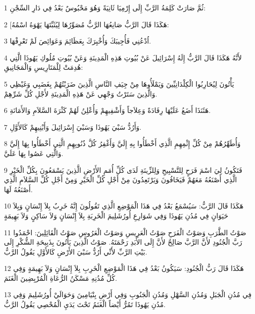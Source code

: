 \par 1 ثُمَّ صَارَتْ كَلِمَةُ الرَّبِّ إِلَى إِرْمِيَا ثَانِيَةً وَهُوَ مَحْبُوسٌ بَعْدُ فِي دَارِ السِّجْنِ:
\par 2 [هَكَذَا قَالَ الرَّبُّ صَانِعُهَا الرَّبُّ مُصَوِّرُهَا لِيُثَبِّتَهَا يَهْوَهُ اسْمُهُ:
\par 3 اُدْعُنِي فَأُجِيبَكَ وَأُخْبِرَكَ بِعَظَائِمَ وَعَوَائِصَ لَمْ تَعْرِفْهَا.
\par 4 لأَنَّهُ هَكَذَا قَالَ الرَّبُّ إِلَهُ إِسْرَائِيلَ عَنْ بُيُوتِ هَذِهِ الْمَدِينَةِ وَعَنْ بُيُوتِ مُلُوكِ يَهُوذَا الَّتِي هُدِمَتْ لِلْمَتَارِيسِ وَالْمَجَانِيقِ:
\par 5 يَأْتُونَ لِيُحَارِبُوا الْكِلْدَانِيِّينَ وَيَمْلَأُوهَا مِنْ جِيَفِ النَّاسِ الَّذِينَ ضَرَبْتُهُمْ بِغَضَبِي وَغَيْظِي وَالَّذِينَ سَتَرْتُ وَجْهِي عَنْ هَذِهِ الْمَدِينَةِ لأَجْلِ كُلِّ شَرِّهِمْ.
\par 6 هَئَنَذَا أَضَعُ عَلَيْهَا رِفَادَةً وَعِلاَجاً وَأَشْفِيهِمْ وَأُعْلِنُ لَهُمْ كَثْرَةَ السَّلاَمِ وَالأَمَانَةِ.
\par 7 وَأَرُدُّ سَبْيَ يَهُوذَا وَسَبْيَ إِسْرَائِيلَ وَأَبْنِيهِمْ كَالأَوَّلِ.
\par 8 وَأُطَهِّرُهُمْ مِنْ كُلِّ إِثْمِهِمِ الَّذِي أَخْطَأُوا بِهِ إِلَيَّ وَأَغْفِرُ كُلَّ ذُنُوبِهِمِ الَّتِي أَخْطَأُوا بِهَا إِلَيَّ وَالَّتِي عَصُوا بِهَا عَلَيَّ.
\par 9 فَتَكُونُ لِيَ اسْمَ فَرَحٍ لِلتَّسْبِيحِ وَلِلزِّينَةِ لَدَى كُلِّ أُمَمِ الأَرْضِ الَّذِينَ يَسْمَعُونَ بِكُلِّ الْخَيْرِ الَّذِي أَصْنَعُهُ مَعَهُمْ فَيَخَافُونَ وَيَرْتَعِدُونَ مِنْ أَجْلِ كُلِّ الْخَيْرِ وَمِنْ أَجْلِ كُلِّ السَّلاَمِ الَّذِي أَصْنَعُهُ لَهَا.
\par 10 هَكَذَا قَالَ الرَّبُّ: سَيُسْمَعُ بَعْدُ فِي هَذَا الْمَوْضِعِ الَّذِي تَقُولُونَ إِنَّهُ خَرِبٌ بِلاَ إِنْسَانٍ وَبِلاَ حَيَوَانٍ فِي مُدُنِ يَهُوذَا وَفِي شَوَارِعِ أُورُشَلِيمَ الْخَرِبَةِ بِلاَ إِنْسَانٍ وَلاَ سَاكِنٍ وَلاَ بَهِيمَةٍ
\par 11 صَوْتُ الطَّرَبِ وَصَوْتُ الْفَرَحِ صَوْتُ الْعَرِيسِ وَصَوْتُ الْعَرُوسِ صَوْتُ الْقَائِلِينَ: احْمَدُوا رَبَّ الْجُنُودِ لأَنَّ الرَّبَّ صَالِحٌ لأَنَّ إِلَى الأَبَدِ رَحْمَتَهُ. صَوْتُ الَّذِينَ يَأْتُونَ بِذَبِيحَةِ الشُّكْرِ إِلَى بَيْتِ الرَّبِّ لأَنِّي أَرُدُّ سَبْيَ الأَرْضِ كَالأَوَّلِ يَقُولُ الرَّبُّ.
\par 12 هَكَذَا قَالَ رَبُّ الْجُنُودِ: سَيَكُونُ بَعْدُ فِي هَذَا الْمَوْضِعِ الْخَرِبِ بِلاَ إِنْسَانٍ وَلاَ بَهِيمَةٍ وَفِي كُلِّ مُدُنِهِ مَسْكَنُ الرُّعَاةِ الْمُرْبِضِينَ الْغَنَمَ.
\par 13 فِي مُدُنِ الْجَبَلِ وَمُدُنِ السَّهْلِ وَمُدُنِ الْجَنُوبِ وَفِي أَرْضِ بِنْيَامِينَ وَحَوَالَيْ أُورُشَلِيمَ وَفِي مُدُنِ يَهُوذَا تَمُرُّ أَيْضاً الْغَنَمُ تَحْتَ يَدَيِ الْمُحْصِي يَقُولُ الرَّبُّ.
